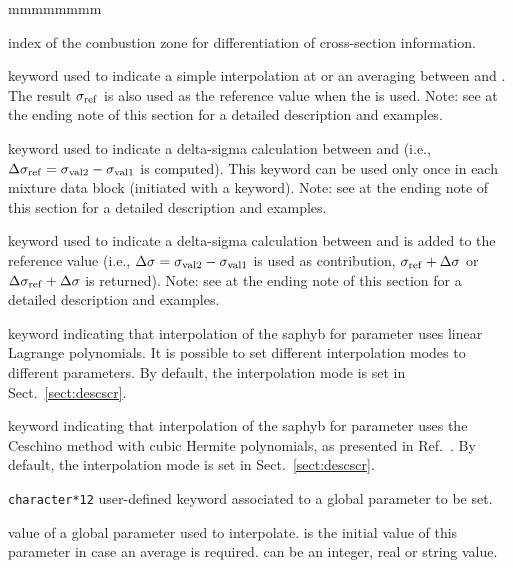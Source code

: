 \begin{ListeDeDescription}{mmmmmmmm}
\item[\dusa{ivarty}] index of the combustion zone for differentiation of cross-section information.

\item[\moc{SET}] keyword used to indicate a simple interpolation at  or an averaging between  and . The result $\sigma_{\rm ref}$ is also used as the reference value when the  is used. Note: see at the ending note of this section for a detailed description and examples.

\item[\moc{DELTA}] keyword used to indicate a delta-sigma calculation between  and 
(i.e., $\Delta\sigma_{\rm ref}=\sigma_{\rm val2}-\sigma_{\rm val1}$ is computed). This keyword can be used only once in each mixture data block (initiated
with a  keyword). Note: see at the ending note of this section for a detailed description and examples.

\item[\moc{ADD}] keyword used to indicate a delta-sigma calculation between  and  is added to the reference value
(i.e., $\Delta\sigma=\sigma_{\rm val2}-\sigma_{\rm val1}$ is used as contribution, $\sigma_{\rm ref}+\Delta\sigma$ or $\Delta\sigma_{\rm ref}+\Delta\sigma$ is returned). Note: see at the ending note of this section for a detailed description and examples.

\item[\moc{LINEAR}] keyword indicating that interpolation of the {\sc saphyb} for parameter  uses linear Lagrange
polynomials. It is possible to set different interpolation modes to different parameters. By default, the interpolation mode is set in Sect.~\ref{sect:descscr}.

\item[\moc{CUBIC}] keyword indicating that interpolation of the {\sc saphyb} for parameter  uses the Ceschino method
with cubic Hermite polynomials, as presented in Ref.~. By default, the interpolation mode is set in Sect.~\ref{sect:descscr}.

\item[\dusa{PARKEY}] {\tt character*12} user-defined keyword associated to a global
parameter to be set.

\item[\dusa{val1}] value of a global parameter used to interpolate.   is the initial value of this parameter in case an average is required.  can be an integer, real or string value.


\end{ListeDeDescription}
